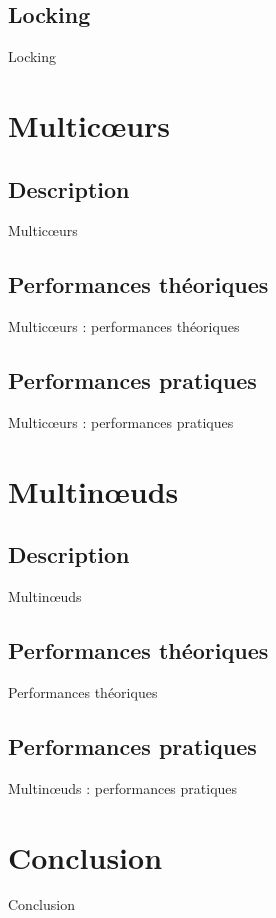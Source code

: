 \documentclass[9.5pt]{beamer}
\begin{document}
\subsection{Locking}
	\begin{frame}{Locking}

	\end{frame}

\section{Multic\oe{}urs}
	\subsection{Description}
	\begin{frame}{Multic\oe{}urs}

	\end{frame}

\subsection{Performances théoriques}
	\begin{frame}{Multic\oe{}urs : performances théoriques}

	\end{frame}

\subsection{Performances pratiques}
	\begin{frame}{Multic\oe{}urs : performances pratiques}

	\end{frame}

\section{Multin\oe{}uds}
	\subsection{Description}
		\begin{frame}{Multin\oe{}uds}

		\end{frame}

\subsection{Performances théoriques}
	\begin{frame}{Performances théoriques}

	\end{frame}

\subsection{Performances pratiques}

	\begin{frame}{Multin\oe{}uds : performances pratiques}

	\end{frame}

\section{Conclusion}
	\begin{frame}{Conclusion}

	\end{frame}
\end{document}
